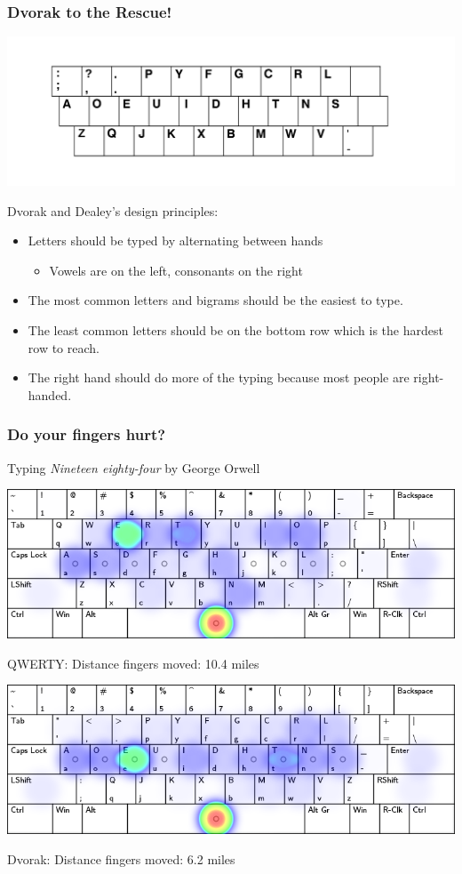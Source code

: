 \documentclass{beamer}
\begin{document}
\begin{frame}
    \frametitle{Dvorak to the Rescue!}
    \begin{center}
    \vskip-1cm
        \includegraphics[width=\linewidth]{graphics/originaldvorak}
    \end{center}
    \vskip-1cm
    Dvorak and Dealey's design principles:
    \begin{itemize}[<+->]
        \item Letters should be typed by alternating between hands
            \begin{itemize}
                \item Vowels are on the left, consonants on the right
            \end{itemize}
        \item The most common letters and bigrams should be the easiest to
            type.
        \item The least common letters should be on the bottom row which is the
            hardest row to reach.
        \item The right hand should do more of the typing because most people
            are right-handed.
    \end{itemize}
\end{frame}

\begin{frame}
    \frametitle{Do your fingers hurt?}
    Typing \emph{Nineteen eighty-four} by George Orwell
    \begin{center}
        \includegraphics[width=0.8\linewidth]{graphics/qwertyheat}\par
        QWERTY: Distance fingers moved: 10.4 miles

        \smallskip
        \includegraphics[width=0.8\linewidth]{graphics/dvorakheat}\par
        Dvorak: Distance fingers moved: 6.2 miles
    \end{center}
\end{frame}
\end{document}
